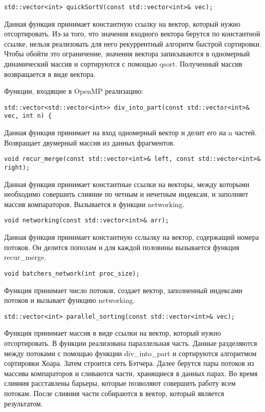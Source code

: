 \documentclass{report}
\begin{document}
\begin{lstlisting}
std::vector<int> quickSortV(const std::vector<int>& vec);
\end{lstlisting}
\par Данная функция принимает константную ссылку на вектор, который нужно отсортировать. Из-за того, что значения входного вектора берутся по константной ссылке, нельзя реализовать для него рекуррентный алгоритм быстрой сортировки. Чтобы обойти это ограничение, значения вектора записываются в одномерный динамический массив и сортируются с помощью qsort. Полученный массив возвращается в виде вектора.

\par Функции, входящие в OpenMP реализацию:

\begin{lstlisting}
std::vector<std::vector<int>> div_into_part(const std::vector<int>& vec, int n) {
\end{lstlisting}
\par Данная функция принимает на вход одномерный вектор и делит его на n частей. Возвращает двумерный массив из данных фрагментов.

\begin{lstlisting}
void recur_merge(const std::vector<int>& left, const std::vector<int>& right);
\end{lstlisting}
\par Данная функция принимает константные ссылки на векторы, между которыми необходимо совершить слияние по четным и нечетным индексам, и заполняет массив компараторов. Вызывается в функции networking.

\begin{lstlisting}
void networking(const std::vector<int>& arr);
\end{lstlisting}
\par Данная функция принимает константную сслылку на вектор, содержащий номера потоков. Он делится пополам и для каждой половины вызывается функция recur\_merge.

\begin{lstlisting}
void batchers_network(int proc_size);
\end{lstlisting}
\par Функция принимает число потоков, создает вектор, заполненный индексами потоков и вызывает функцию networking.

\begin{lstlisting}
std::vector<int> parallel_sorting(const std::vector<int>& vec);
\end{lstlisting}
\par Функция принимает массив в виде ссылки на вектор, который нужно отсортировать. В функции реализована параллельная часть. Данные разделяются между потоками с помощью функции div\_into\_part и сортируются алгоритмом сортировки Хоара. Затем строится сеть Бэтчера. Далее берутся пары потоков из массива компараторов и сливаются части, хранящиеся в данных парах. Во время слияния расставлены барьеры, которые позволяют совершить работу всем потокам. После слияния части собираются в вектор, который является результатом.  
\end{document}
